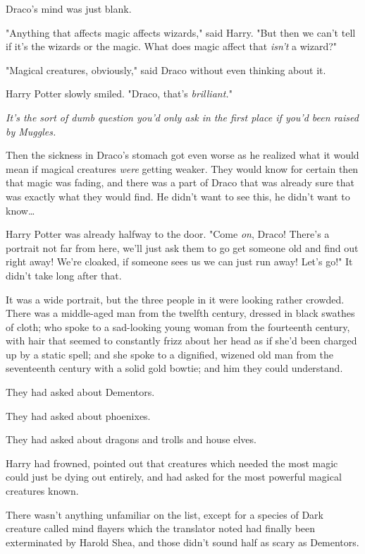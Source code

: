 Draco's mind was just blank.

"Anything that affects magic affects wizards," said Harry. "But then we can't 
tell if it's the wizards or the magic. What does magic affect that \emph{isn't} 
a wizard?"

"Magical creatures, obviously," said Draco without even thinking about it.

Harry Potter slowly smiled. "Draco, that's \emph{brilliant.}"

\emph{It's the sort of dumb question you'd only ask in the first place if you'd 
been raised by Muggles.}

Then the sickness in Draco's stomach got even worse as he realized what it 
would mean if magical creatures \emph{were} getting weaker. They would know for 
certain then that magic was fading, and there was a part of Draco that was 
already sure that was exactly what they would find. He didn't want to see this, 
he didn't want to know{\ldots}

Harry Potter was already halfway to the door. "Come \emph{on}, Draco! There's a 
portrait not far from here, we'll just ask them to go get someone old and find 
out right away! We're cloaked, if someone sees us we can just run away! Let's 
go!"
\sbreak
It didn't take long after that.

It was a wide portrait, but the three people in it were looking rather crowded. 
There was a middle-aged man from the twelfth century, dressed in black swathes 
of cloth; who spoke to a sad-looking young woman from the fourteenth century, 
with hair that seemed to constantly frizz about her head as if she'd been 
charged up by a static spell; and she spoke to a dignified, wizened old man 
from the seventeenth century with a solid gold bowtie; and him they could 
understand.

They had asked about Dementors.

They had asked about phoenixes.

They had asked about dragons and trolls and house elves.

Harry had frowned, pointed out that creatures which needed the most magic could 
just be dying out entirely, and had asked for the most powerful magical 
creatures known.

There wasn't anything unfamiliar on the list, except for a species of Dark 
creature called mind flayers which the translator noted had finally been 
exterminated by Harold Shea, and those didn't sound half as scary as Dementors.

